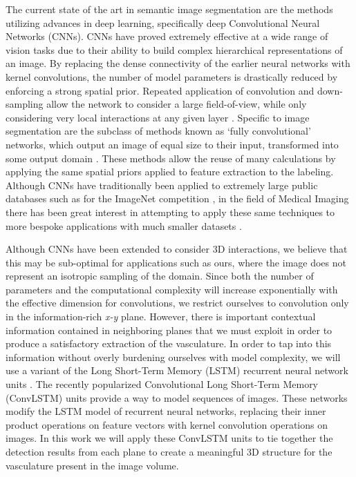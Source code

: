 \documentclass[journal,transmag]{IEEEtran}
\begin{document}
The current state of the art in semantic image segmentation are the methods utilizing advances in deep learning, specifically deep Convolutional Neural Networks (CNNs). CNNs have proved extremely effective at a wide range of vision tasks due to their ability to build complex hierarchical representations of an image. By replacing the dense connectivity of the earlier neural networks with kernel convolutions, the number of model parameters is drastically reduced by enforcing a strong spatial prior. Repeated application of convolution and down-sampling allow the network to consider a large field-of-view, while only considering very local interactions at any given layer \cite{Simonyan2014,Krizhevsky2012}. Specific to image segmentation are the subclass of methods known as `fully convolutional' networks, which output an image of equal size to their input, transformed into some output domain \cite{Long2015}. These methods allow the reuse of many calculations by applying the same spatial priors applied to feature extraction to the labeling. Although CNNs have traditionally been applied to extremely large public databases such as for the ImageNet competition \cite{Russakovsky2015}, in the field of Medical Imaging there has been great interest in attempting to apply these same techniques to more bespoke applications with much smaller datasets \cite{Greenspan2016}.

Although CNNs have been extended to consider 3D interactions, we believe that this may be sub-optimal for applications such as ours, where the image does not represent an isotropic sampling of the domain. Since both the number of parameters and the computational complexity will increase exponentially with the effective dimension for convolutions, we restrict ourselves to convolution only in the information-rich \textit{x-y} plane. However, there is important contextual information contained in neighboring planes that we must exploit in order to produce a satisfactory extraction of the vasculature. In order to tap into this information without overly burdening ourselves with model complexity, we will use a variant of the Long Short-Term Memory (LSTM) recurrent neural network units \cite{Hochreiter1997}. The recently popularized Convolutional Long Short-Term Memory (ConvLSTM) units \cite{SHI2015} provide a way to model sequences of images. These networks modify the LSTM model of recurrent neural networks, replacing their inner product operations on feature vectors with kernel convolution operations on images. In this work we will apply these ConvLSTM units to tie together the detection results from each plane to create a meaningful 3D structure for the vasculature present in the image volume. 
\end{document}
